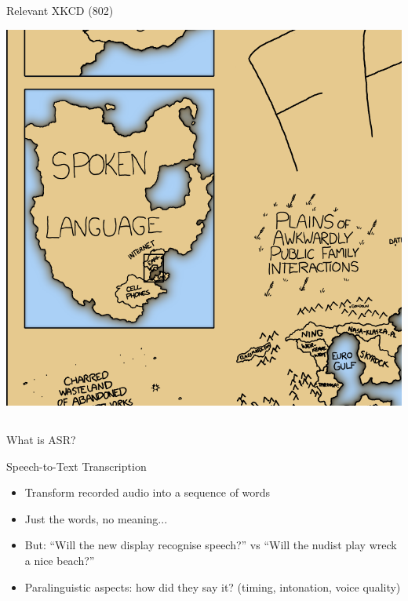 \documentclass[9pt,xcolor=pdftex,dvipsnames,table]{beamer}
\begin{document}
\subsection{}
\begin{frame}{Relevant XKCD (802)}

	\begin{center}
    \includegraphics[scale=.75]{ASRXKCD-zoom}
	\end{center}
	
\end{frame}

\subsection{}
\begin{frame}{What is ASR?}

{\large Speech-to-Text Transcription }
	\begin{itemize}
		\item Transform recorded audio into a sequence of words
		\item Just the words, no meaning...\pause
		\item But: ``Will the new display recognise speech?'' vs ``Will the nudist play wreck a nice beach?''
		\item Paralinguistic aspects: how did they say it? (timing, intonation, voice quality)
	\end{itemize}
\end{frame}
\end{document}
